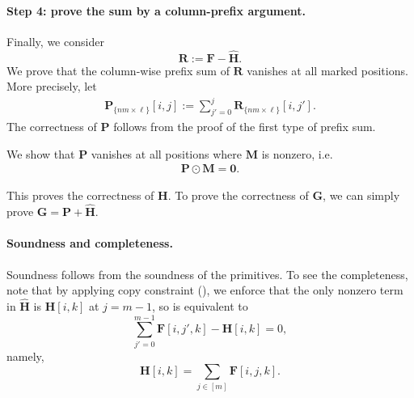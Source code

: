 \paragraph{Step 4: prove the sum by a column-prefix argument.}
Finally, we consider
\[
    \mathbf{R}:=\mathbf{F}-\widehat{\mathbf{H}}.
\]
We prove that the column-wise prefix sum of $\mathbf{R}$ vanishes at all marked
positions. More precisely, let
\begin{align}
    \mathbf{P}_{\{nm\times \ell\}}[i, j]
    :=
    \sum_{j'=0}^{j}\mathbf{R}_{\{nm\times \ell\}}[i, j'].\label{eq:column-prefix-vanishes-at-mask}
\end{align}
The correctness of $\mathbf{P}$ follows from the proof of the first type of prefix sum.

We show that $\mathbf{P}$ vanishes at all positions where $\mathbf{M}$ is nonzero, i.e.
\begin{align}
  \mathbf{P}\odot \mathbf{M} = \mathbf{0}.
\end{align}

This proves the correctness of $\mathbf{H}$.
  To prove the correctness of $\mathbf{G}$, we can simply prove $\mathbf{G} = \mathbf{P} + \widehat{\mathbf{H}}$.

\paragraph{Soundness and completeness.}
Soundness follows from the soundness of the primitives.
To see the completeness, note that
by applying copy constraint (),
we enforce that the only nonzero term in $\widehat{\mathbf{H}}$ is
$\mathbf{H}[i,k]$ at $j=m-1$, so  is equivalent to
\[
    \sum_{j'=0}^{m-1}\mathbf{F}[i,j',k]-\mathbf{H}[i,k]=0,
\]
namely,
\[
    \mathbf{H}[i,k]=\sum_{j\in[m]}\mathbf{F}[i,j,k].
\]

